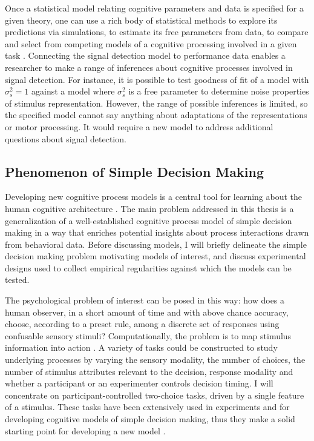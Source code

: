 \documentclass[12pt]{article}
\begin{document}
	Once a statistical model relating cognitive parameters and data is specified for a given theory, one can use a rich body of statistical methods to explore its predictions via simulations, to estimate its free parameters from data, to compare and select from competing models of a cognitive processing involved in a given task \citep{Ber1997,CasBer2002,GelCar2013}. Connecting the signal detection model to performance data enables a researcher to make a range of inferences about cognitive processes involved in signal detection. For instance, it is possible to test goodness of fit of a model with $\sigma_s^2 = 1$ against a model where $\sigma_s^2$ is a free parameter to determine noise properties of stimulus representation. However, the range of possible inferences is limited, so the specified model cannot say anything about adaptations of the representations or motor processing. It would require a new model to address additional questions about signal detection. 

\subsection{Phenomenon of Simple Decision Making}
	Developing new cognitive process models is a central tool for learning about the human cognitive architecture \citep{BusDie2010,LewFar2010,LeeWag2014}. The main problem addressed in this thesis is a generalization of a well-established cognitive process model of simple decision making in a way that enriches potential insights about process interactions drawn from behavioral data. Before discussing models, I will briefly delineate the simple decision making problem motivating models of interest, and discuss experimental designs used to collect empirical regularities against which the models can be tested.
    
	The psychological problem of interest can be posed in this way: how does a human observer, in a short amount of time and with above chance accuracy, choose, according to a preset rule, among a discrete set of responses using confusable sensory stimuli? Computationally, the problem is to map stimulus information into action \citep{Vic1979,BogRaf2006}. A variety of tasks could be constructed to study underlying processes by varying the sensory modality, the number of choices, the number of stimulus attributes relevant to the decision, response modality and whether a participant or an experimenter controls decision timing. I will concentrate on participant-controlled two-choice tasks, driven by a single feature of a stimulus. These tasks have been extensively used in experiments and for developing cognitive models of simple decision making, thus they make a solid starting point for developing a new model \citep{Luc1986,RatSmi2004,RatMck2008,Wag2009}.
    
\end{document}
